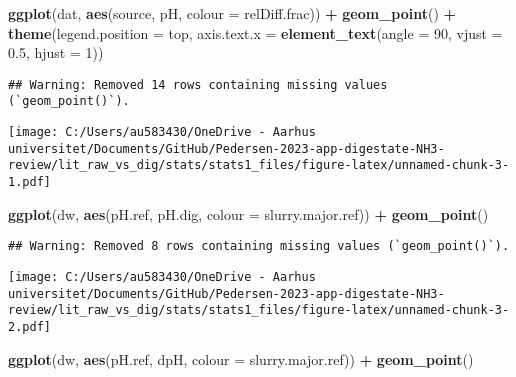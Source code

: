 \documentclass[
]{article}
\newenvironment{Shaded}{\begin{snugshade}}{\end{snugshade}}
\newcommand{\AttributeTok}[1]{\textcolor[rgb]{0.13,0.29,0.53}{#1}}
\newcommand{\DecValTok}[1]{\textcolor[rgb]{0.00,0.00,0.81}{#1}}
\newcommand{\FloatTok}[1]{\textcolor[rgb]{0.00,0.00,0.81}{#1}}
\newcommand{\FunctionTok}[1]{\textcolor[rgb]{0.13,0.29,0.53}{\textbf{#1}}}
\newcommand{\NormalTok}[1]{#1}
\newcommand{\SpecialCharTok}[1]{\textcolor[rgb]{0.81,0.36,0.00}{\textbf{#1}}}
\newcommand{\StringTok}[1]{\textcolor[rgb]{0.31,0.60,0.02}{#1}}
\begin{document}
\begin{Shaded}
\begin{Highlighting}[]
\FunctionTok{ggplot}\NormalTok{(dat, }\FunctionTok{aes}\NormalTok{(source, pH, }\AttributeTok{colour =}\NormalTok{ relDiff.frac)) }\SpecialCharTok{+}
  \FunctionTok{geom\_point}\NormalTok{() }\SpecialCharTok{+}
  \FunctionTok{theme}\NormalTok{(}\AttributeTok{legend.position =} \StringTok{\textquotesingle{}top\textquotesingle{}}\NormalTok{, }\AttributeTok{axis.text.x =} \FunctionTok{element\_text}\NormalTok{(}\AttributeTok{angle =} \DecValTok{90}\NormalTok{, }\AttributeTok{vjust =} \FloatTok{0.5}\NormalTok{, }\AttributeTok{hjust =} \DecValTok{1}\NormalTok{))}
\end{Highlighting}
\end{Shaded}

\begin{verbatim}
## Warning: Removed 14 rows containing missing values (`geom_point()`).
\end{verbatim}

\texttt{[image: C:/Users/au583430/OneDrive - Aarhus universitet/Documents/GitHub/Pedersen-2023-app-digestate-NH3-review/lit\_raw\_vs\_dig/stats/stats1\_files/figure-latex/unnamed-chunk-3-1.pdf]}

\begin{Shaded}
\begin{Highlighting}[]
\FunctionTok{ggplot}\NormalTok{(dw, }\FunctionTok{aes}\NormalTok{(pH.ref, pH.dig, }\AttributeTok{colour =}\NormalTok{ slurry.major.ref)) }\SpecialCharTok{+}
  \FunctionTok{geom\_point}\NormalTok{()}
\end{Highlighting}
\end{Shaded}

\begin{verbatim}
## Warning: Removed 8 rows containing missing values (`geom_point()`).
\end{verbatim}

\texttt{[image: C:/Users/au583430/OneDrive - Aarhus universitet/Documents/GitHub/Pedersen-2023-app-digestate-NH3-review/lit\_raw\_vs\_dig/stats/stats1\_files/figure-latex/unnamed-chunk-3-2.pdf]}

\begin{Shaded}
\begin{Highlighting}[]
\FunctionTok{ggplot}\NormalTok{(dw, }\FunctionTok{aes}\NormalTok{(pH.ref, dpH, }\AttributeTok{colour =}\NormalTok{ slurry.major.ref)) }\SpecialCharTok{+}
  \FunctionTok{geom\_point}\NormalTok{()}
\end{Highlighting}
\end{Shaded}
\end{document}

